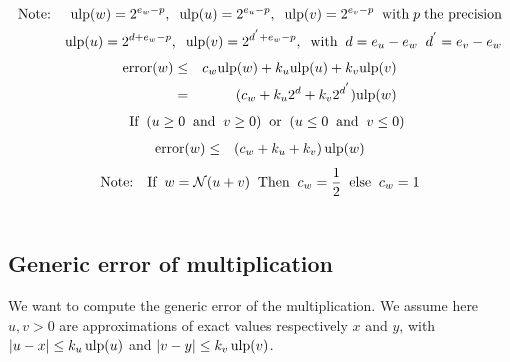 \documentclass[12pt]{amsart}
\def\ulp{{\rm ulp}}
\def\N{{\mathcal N}}
\DeclareMathOperator{\error}{error}
\begin{document}
\begin{eqnarray}\nonumber
\textnormal{Note:}&& \ulp(w)=2^{e_w-p}, \;\; \ulp(u)=2^{e_u-p},\;\; \ulp(v)=2^{e_v-p}\;\;\textnormal{with} \; p \; \textnormal{the precision} \\\nonumber
&& \ulp(u)=2^{d+e_w-p}, \;\; \ulp(v)=2^{d^{'}+e_w-p},\;\;\textnormal{with} \;\;d=e_u-e_w \;\; d^{'}=e_v-e_w
\end{eqnarray}
\begin{eqnarray}\nonumber
\error(w)& \leq &c_w \ulp(w) + k_u \ulp(u) + k_v \ulp(v) \\\nonumber
&=&(c_w+k_u 2^d+ k_v 2^{d^{'}}) \ulp(w)
\end{eqnarray}
\begin{eqnarray}\nonumber
&&\textnormal{If} \;\; ( u \geq 0  \;\;\textnormal{and}\;\;  v \geq 0) \;\;\textnormal{or}\;\; (u \leq 0 \;\;\textnormal{and}\;\; v \leq 0)
\end{eqnarray}
\begin{eqnarray}\nonumber
\error(w)& \leq&(c_w + k_u + k_v) \, \ulp(w)
\end{eqnarray}
\begin{eqnarray}\nonumber
\textnormal{Note:}&&\textnormal{If}\;\; w=\N(u+v) \;\;\textnormal{Then}\;\; c_w =\frac{1}{2} \;\;\textnormal{else}\;\; c_w =1\\\nonumber
\end{eqnarray}

\subsection{Generic error of multiplication}\label{generic:mul}

We want to compute the generic error of the multiplication.
We assume here $u, v > 0$ are approximations of exact values respectively $x$
and $y$, with $|u - x| \leq k_u \, \ulp(u)$ and $|v - y| \leq k_v \, \ulp(v)$.
\end{document}
